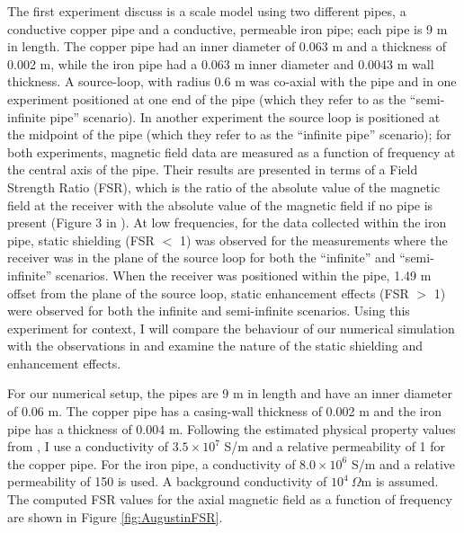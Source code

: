 The first experiment \cite{Augustin1989} discuss is a scale model using two different pipes, a conductive copper pipe and a conductive, permeable iron pipe; each pipe is 9 m in length. The copper pipe had an inner diameter of 0.063 m and a thickness of 0.002 m, while the iron pipe had a 0.063 m inner diameter and 0.0043 m wall thickness. A source-loop, with radius 0.6 m was co-axial with the pipe and in one experiment positioned at one end of the pipe (which they refer to as the ``semi-infinite pipe'' scenario). In another experiment the source loop is positioned at the midpoint of the pipe (which they refer to as the ``infinite pipe'' scenario); for both experiments, magnetic field data are measured as a function of frequency at the central axis of the pipe. Their results are presented in terms of a Field Strength Ratio (FSR), which is the ratio of the absolute value of the magnetic field at the receiver with the absolute value of the magnetic field if no pipe is present (Figure 3 in \cite{Augustin1989}). At low frequencies, for the data collected within the iron pipe, static shielding (FSR $<$ 1) was observed for the measurements where the receiver was in the plane of the source loop for both the ``infinite'' and ``semi-infinite'' scenarios. When the receiver was positioned within the pipe, 1.49 m offset from the plane of the source loop, static enhancement effects (FSR $>$ 1) were observed for both the infinite and semi-infinite scenarios. Using this experiment for context, I will compare the behaviour of our numerical simulation with the observations in \citep{Augustin1989} and examine the nature of the static shielding and enhancement effects.

For our numerical setup, the pipes are 9 m in length and have an inner diameter of 0.06 m. The copper pipe has a casing-wall thickness of 0.002 m and the iron pipe has a thickness of 0.004 m. Following the estimated physical property values from \cite{Augustin1989}, I use a conductivity of $3.5 \times 10^7$ S/m and a relative permeability of 1 for the copper pipe. For the iron pipe, a conductivity of $8.0 \times 10^6$ S/m and a relative permeability of 150 is used. A background conductivity of $10^4 ~\Omega$m is assumed. The computed FSR values for the axial magnetic field as a function of frequency are shown in Figure \ref{fig:AugustinFSR}.




